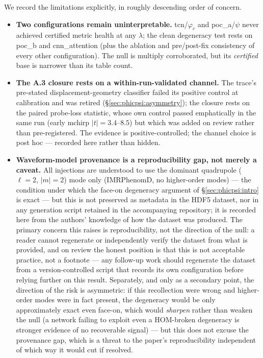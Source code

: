 \documentclass[11pt]{article}
\begin{document}
We record the limitations explicitly, in roughly descending order of concern.
\begin{itemize}
\item \textbf{Two configurations remain uninterpretable.} tcn/$\varphi_c$ and poc\_a/$\psi$ never achieved certified metric health at any $\lambda$; the clean degeneracy test rests on poc\_b and cnn\_attention (plus the ablation and pre/post-fix consistency of every other configuration).
The null is multiply corroborated, but its \emph{certified} base is narrower than its table count.
\item \textbf{The A.3 closure rests on a within-run-validated channel.}
The trace's pre-stated displacement-geometry classifier failed its positive control at calibration and was retired (\S\ref{sec:phicpsi:asymmetry}); the closure rests on the paired probe-loss statistic, whose own control passed emphatically in the same run (early mchirp $|t| = 3.4$--$8.5$) but which was added on review rather than pre-registered.
The evidence is positive-controlled; the channel choice is post hoc --- recorded here rather than hidden.
\item \textbf{Waveform-model provenance is a reproducibility gap, not merely a caveat.}
All injections are understood to use the dominant quadrupole ($\ell=2$, $|m|=2$) mode only (IMRPhenomD, no higher-order modes) --- the condition under which the face-on degeneracy argument of \S\ref{sec:phicpsi:intro} is exact --- but this is not preserved as metadata in the HDF5 dataset, nor in any generation script retained in the accompanying repository; it is recorded here from the authors' knowledge of how the dataset was produced.
The primary concern this raises is reproducibility, not the direction of the null: a reader cannot regenerate or independently verify the dataset from what is provided, and on review the honest position is that this is not acceptable practice, not a footnote --- any follow-up work should regenerate the dataset from a version-controlled script that records its own configuration before relying further on this result.
Separately, and only as a secondary point, the direction of the risk is asymmetric: if this recollection were wrong and higher-order modes were in fact present, the degeneracy would be only approximately exact even face-on, which would \emph{sharpen} rather than weaken the null (a network failing to exploit even a HOM-broken degeneracy is stronger evidence of no recoverable signal) --- but this does not excuse the provenance gap, which is a threat to the paper's reproducibility independent of which way it would cut if resolved.

\end{itemize}
\end{document}

